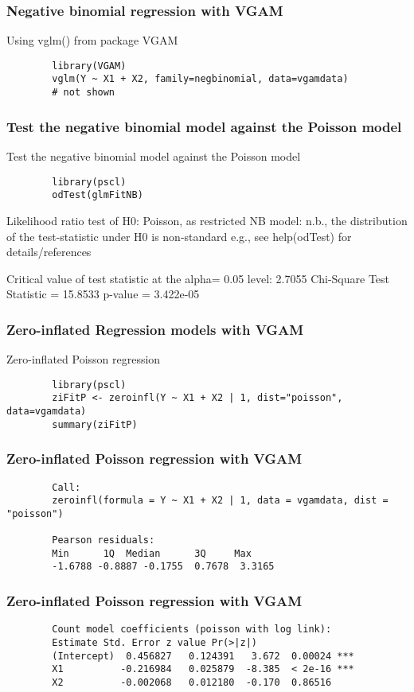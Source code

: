 \documentclass{beamer}
\begin{document}
	\begin{frame}[fragile]
		\frametitle{Negative binomial regression with VGAM}
		Using vglm() from package VGAM
		\begin{verbatim}
		library(VGAM)
		vglm(Y ~ X1 + X2, family=negbinomial, data=vgamdata)
		# not shown
		\end{verbatim}
		
		
	\end{frame}
	\begin{frame}[fragile]
		\frametitle{Test the negative binomial model against the Poisson model}
		Test the negative binomial model against the Poisson model
		\begin{verbatim}
		library(pscl)
		odTest(glmFitNB)
		\end{verbatim}
		Likelihood ratio test of H0: Poisson, as restricted NB model:
		n.b., the distribution of the test-statistic under H0 is non-standard
		e.g., see help(odTest) for details/references
		
		Critical value of test statistic at the alpha= 0.05 level: 2.7055 
		Chi-Square Test Statistic =  15.8533 p-value = 3.422e-05 
		
	\end{frame}
	\begin{frame}[fragile]
		\frametitle{Zero-inflated Regression models with VGAM}
		Zero-inflated Poisson regression
		\begin{verbatim}
		library(pscl)
		ziFitP <- zeroinfl(Y ~ X1 + X2 | 1, dist="poisson", data=vgamdata)
		summary(ziFitP)
		\end{verbatim}
	\end{frame}
	\begin{frame}[fragile]
		\frametitle{Zero-inflated Poisson regression with VGAM}
		\begin{verbatim}
		Call:
		zeroinfl(formula = Y ~ X1 + X2 | 1, data = vgamdata, dist = "poisson")
		
		Pearson residuals:
		Min      1Q  Median      3Q     Max 
		-1.6788 -0.8887 -0.1755  0.7678  3.3165 
		\end{verbatim}
	\end{frame}
	\begin{frame}[fragile]
		\frametitle{Zero-inflated Poisson regression with VGAM}
		\begin{verbatim}
		Count model coefficients (poisson with log link):
		Estimate Std. Error z value Pr(>|z|)    
		(Intercept)  0.456827   0.124391   3.672  0.00024 ***
		X1          -0.216984   0.025879  -8.385  < 2e-16 ***
		X2          -0.002068   0.012180  -0.170  0.86516    
		\end{verbatim}
	\end{frame}
\end{document}
